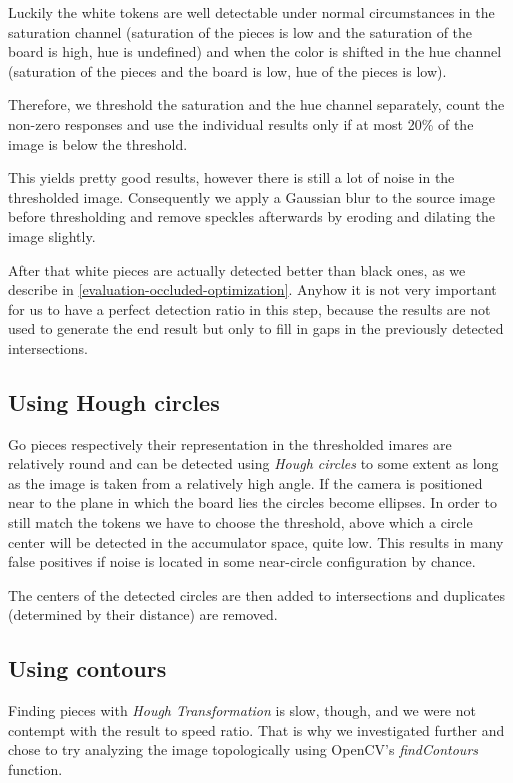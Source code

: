 	Luckily the white tokens are well detectable under normal circumstances in the saturation channel (saturation of the pieces is low and the saturation of the board is high, hue is undefined) and when the color is shifted in the hue channel (saturation of the pieces and the board is low, hue of the pieces is low).

	Therefore, we threshold the saturation and the hue channel separately, count the non-zero responses and use the individual results only if at most 20\% of the image is below the threshold.

	This yields pretty good results, however there is still a lot of noise in the thresholded image. Consequently we apply a Gaussian blur to the source image before thresholding and remove speckles afterwards by eroding and dilating the image slightly.

	After that white pieces are actually detected better than black ones, as we describe in \autoref{evaluation-occluded-optimization}. Anyhow it is not very important for us to have a perfect detection ratio in this step, because the results are not used to generate the end result but only to fill in gaps in the previously detected intersections.

	\subsection{Using Hough circles}
	\label{detector-occluded-hough}
	Go pieces respectively their representation in the thresholded imares are relatively round and can be detected using \emph{Hough circles} to some extent as long as the image is taken from a relatively high angle. If the camera is positioned near to the plane in which the board lies the circles become ellipses. In order to still match the tokens we have to choose the threshold, above which a circle center will be detected in the accumulator space, quite low. This results in many false positives if noise is located in some near-circle configuration by chance.

	The centers of the detected circles are then added to intersections and duplicates (determined by their distance) are removed.

	\subsection{Using contours}
	\label{detector-occluded-contours}
	Finding pieces with \emph{Hough Transformation} is slow, though, and we were not contempt with the result to speed ratio. That is why we investigated further and chose to try analyzing the image topologically \cite{suzuki1985topological} using OpenCV's \emph{findContours} function.

